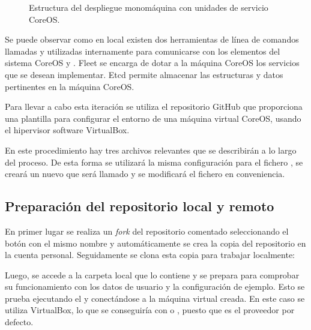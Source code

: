 \begin{figure}[H] 
\centering
{}
\caption{Estructura del despliegue monomáquina con unidades de servicio CoreOS.\label{fig:coreosdiagram}}
\end{figure}

Se puede observar como en local existen dos herramientas de línea de comandos llamadas  y  utilizadas internamente para comunicarse con los elementos del sistema CoreOS  y . Fleet se encarga de dotar a la máquina CoreOS los servicios que se desean implementar. Etcd permite almacenar las estructuras y datos pertinentes en la máquina CoreOS.

Para llevar a cabo esta iteración se utiliza el repositorio GitHub  que proporciona una plantilla  para configurar el entorno de una máquina virtual CoreOS, usando el hipervisor software VirtualBox.

En este procedimiento hay tres archivos relevantes que se describirán a lo largo del proceso. De esta forma se utilizará la misma configuración para el fichero , se creará un nuevo  que será llamado  y se modificará el fichero  en conveniencia.

\subsection{Preparación del repositorio local y remoto}

En primer lugar se realiza un \textit{fork} del repositorio  comentado seleccionando el botón con el mismo nombre y automáticamente se crea la copia del repositorio en la cuenta personal. Seguidamente se clona esta copia para trabajar localmente:


Luego, se accede a la carpeta local que lo contiene y se prepara para comprobar su funcionamiento con los datos de usuario y la configuración de ejemplo. Esto se prueba ejecutando el  y conectándose a la máquina virtual creada. En este caso se utiliza VirtualBox, lo que se conseguiría con  o , puesto que es el proveedor por defecto. 

